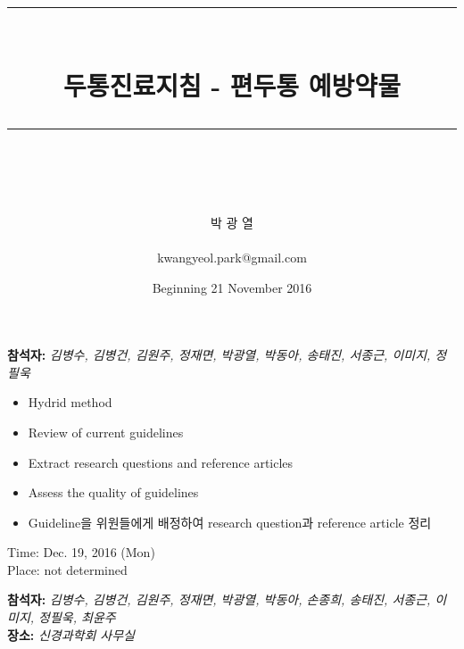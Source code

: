 \documentclass[idxtotoc,hyperref,openany, oneside]{labbook} %
\newcommand{\attend}[1]{\textbf{참석자:} \emph{#1}\\}
\newcommand{\place}[1]{\textbf{장소:} \emph{#1}\\}
\newcommand{\HRule}{\rule{\linewidth}{0.5mm}} %
\begin{document}

\frontmatter %
\title{
\begin{center}
\HRule \\[0.4cm]
{\Huge \bfseries 두통진료지침 - 편두통 예방약물}\\[0.2cm] %
\HRule \\[1.5cm]
\end{center}
}
\author{\LARGE 박 광 열 \\ \\ \LARGE kwangyeol.park@gmail.com \\[2cm]} 
\date{Beginning 21 November 2016} %
\maketitle

\tableofcontents

\mainmatter %


\attend{김병수, 김병건, 김원주, 정재면, 박광열, 박동아, 송태진, 서종근, 이미지, 정필욱}

	\begin{itemize}
		\item Hydrid method
		\item Review of current guidelines 
		\item Extract research questions and reference articles
		\item Assess the quality of guidelines
	\end{itemize}

	\begin{itemize}
		\item Guideline을 위원들에게 배정하여 research question과 reference article 정리
	\end{itemize}
	
Time: Dec. 19, 2016 (Mon)\\
Place: not determined
	
\attend{김병수, 김병건, 김원주, 정재면, 박광열, 박동아, 손종희, 송태진, 서종근, 이미지, 정필욱, 최윤주}
\place{신경과학회 사무실}
\end{document}
